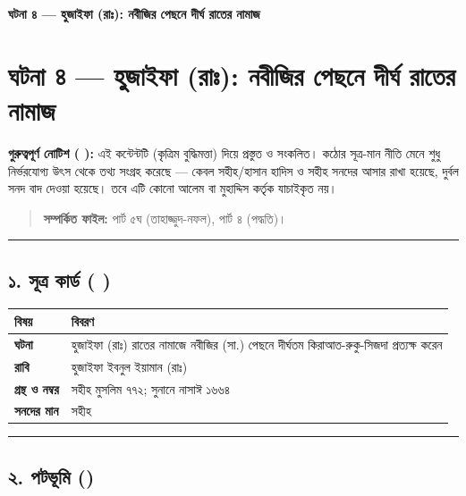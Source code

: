 

\begin{center}{\Large\bfseries\color{emerald} ঘটনা ৪ — হুজাইফা (রাঃ): নবীজির পেছনে দীর্ঘ রাতের নামাজ}\end{center}
\vspace{1em}
\section*{ঘটনা ৪ — হুজাইফা (রাঃ): নবীজির পেছনে দীর্ঘ রাতের নামাজ}

\begin{warnbox}
 \textbf{গুরুত্বপূর্ণ নোটিশ ( ):} এই কন্টেন্টটি  (কৃত্রিম বুদ্ধিমত্তা) দিয়ে প্রস্তুত ও সংকলিত।  কঠোর সূত্র-মান নীতি মেনে শুধু নির্ভরযোগ্য উৎস থেকে তথ্য সংগ্রহ করেছে — কেবল সহীহ/হাসান হাদিস ও সহীহ সনদের আসার রাখা হয়েছে, দুর্বল সনদ বাদ দেওয়া হয়েছে। তবে এটি কোনো আলেম বা মুহাদ্দিস কর্তৃক যাচাইকৃত নয়।
\end{warnbox}

\begin{quote}
\textbf{সম্পর্কিত ফাইল:} পার্ট ৫ঘ (তাহাজ্জুদ-নফল), পার্ট ৪ (পদ্ধতি)।
\end{quote}

\medskip\hrule\medskip

\subsection*{১. সূত্র কার্ড ( )}

\begin{table}[h]\centering\small
\begin{tabular}{ll}
বিষয় & বিবরণ \\
\hline
\textbf{ঘটনা} & হুজাইফা (রাঃ) রাতের নামাজে নবীজির (সা.) পেছনে দীর্ঘতম কিরাআত-রুকু-সিজদা প্রত্যক্ষ করেন \\
\textbf{রাবি} & হুজাইফা ইবনুল ইয়ামান (রাঃ) \\
\textbf{গ্রন্থ ও নম্বর} & সহীহ মুসলিম ৭৭২; সুনানে নাসাঈ ১৬৬৪ \\
\textbf{সনদের মান} & সহীহ \\
\hline
\end{tabular}
\end{table}

\medskip\hrule\medskip

\subsection*{২. পটভূমি ()}

